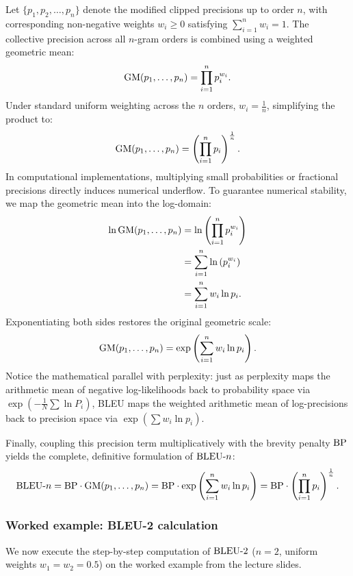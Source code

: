 \documentclass[../../main.tex]{subfiles}
\begin{document}
Let $\{p_1, p_2, \dots, p_n\}$ denote the modified clipped precisions up to order $n$, with corresponding non-negative weights $w_i \ge 0$ satisfying $\sum_{i=1}^n w_i = 1$. The collective precision across all $n$-gram orders is combined using a weighted geometric mean:
\begin{equation}
\label{eq:bleu_geom_mean_raw}
\mathrm{GM}(p_1, \dots, p_n) = \prod_{i=1}^n p_i^{w_i}.
\end{equation}
Under standard uniform weighting across the $n$ orders, $w_i = \frac{1}{n}$, simplifying the product to:
\begin{equation}
\mathrm{GM}(p_1, \dots, p_n) = \left( \prod_{i=1}^n p_i \right)^{\frac{1}{n}}.
\end{equation}
In computational implementations, multiplying small probabilities or fractional precisions directly induces numerical underflow. To guarantee numerical stability, we map the geometric mean into the log-domain:
\begin{align}
\ln \mathrm{GM}(p_1, \dots, p_n) &= \ln\left( \prod_{i=1}^n p_i^{w_i} \right) \nonumber \\
                          &= \sum_{i=1}^n \ln\left( p_i^{w_i} \right) \nonumber \\
                          &= \sum_{i=1}^n w_i \ln p_i.
\end{align}
Exponentiating both sides restores the original geometric scale:
\begin{equation}
\label{eq:bleu_exp_log_sum}
\mathrm{GM}(p_1, \dots, p_n) = \exp\left( \sum_{i=1}^n w_i \ln p_i \right).
\end{equation}
Notice the mathematical parallel with perplexity: just as perplexity maps the arithmetic mean of negative log-likelihoods back to probability space via $\exp(-\frac{1}{N}\sum \ln P_i)$, BLEU maps the weighted arithmetic mean of log-precisions back to precision space via $\exp(\sum w_i \ln p_i)$.

Finally, coupling this precision term multiplicatively with the brevity penalty $\mathrm{BP}$ yields the complete, definitive formulation of $\mathrm{BLEU}\text{-}n$:
\begin{equation}
\label{eq:bleu_full_formula}
\mathrm{BLEU}\text{-}n = \mathrm{BP} \cdot \mathrm{GM}(p_1, \dots, p_n) = \mathrm{BP} \cdot \exp\left( \sum_{i=1}^n w_i \ln p_i \right) = \mathrm{BP} \cdot \left( \prod_{i=1}^n p_i \right)^{\frac{1}{n}}.
\end{equation}

\subsubsection{Worked example: BLEU-2 calculation}
We now execute the step-by-step computation of $\mathrm{BLEU}\text{-}2$ ($n=2$, uniform weights $w_1 = w_2 = 0.5$) on the worked example from the lecture slides.
\end{document}
